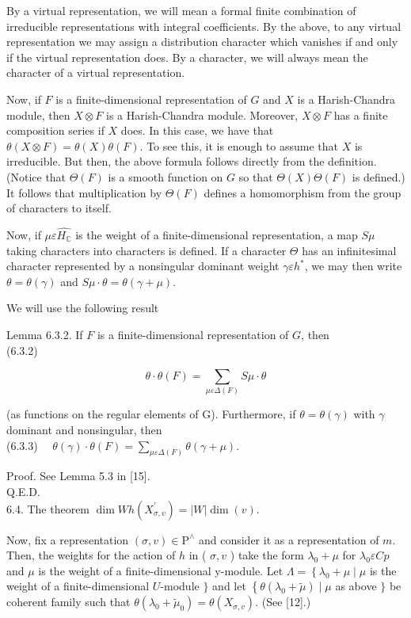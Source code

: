 \documentclass[10pt]{article}
\begin{document}
By a virtual representation, we will mean a formal finite combination of irreducible representations with integral coefficients. By the above, to any virtual representation we may assign a distribution character which vanishes if and only if the virtual representation does. By a character, we will always mean the character of a virtual representation.

Now, if $F$ is a finite-dimensional representation of $G$ and $X$ is a Harish-Chandra module, then $X \otimes F$ is a Harish-Chandra module. Moreover, $X \otimes F$ has a finite composition series if $X$ does. In this case, we have that $\theta(X \otimes F)=\theta(X) \theta(F)$. To see this, it is enough to assume that $X$ is irreducible. But then, the above formula follows directly from the definition. (Notice that $\Theta(F)$ is a smooth function on $G$ so that $\Theta(X) \Theta(F)$ is defined.) It follows that multiplication by $\Theta(F)$ defines a homomorphism from the group of characters to itself.

Now, if $\mu \varepsilon \widehat{H_{\mathbb{C}}}$ is the weight of a finite-dimensional representation, a map $S \mu$ taking characters into characters is defined. If a character $\Theta$ has an infinitesimal character represented by a nonsingular dominant weight $\gamma \varepsilon h^{*}$, we may then write $\theta=\theta(\gamma)$ and $S \mu \cdot \theta=\theta(\gamma+\mu)$.

We will use the following result

Lemma 6.3.2. If $F$ is a finite-dimensional representation of $G$, then\\
(6.3.2)

$$
\theta \cdot \theta(F)=\sum_{\mu \varepsilon \Delta(F)} S \mu \cdot \theta
$$

(as functions on the regular elements of G). Furthermore, if $\theta=\theta(\gamma)$ with $\gamma$ dominant and nonsingular, then\\
(6.3.3) $\quad \theta(\gamma) \cdot \theta(F)=\sum_{\mu \varepsilon \Delta(F)} \theta(\gamma+\mu)$.

Proof. See Lemma 5.3 in [15].\\
Q.E.D.\\
6.4. The theorem $\operatorname{dim} W h\left(X_{\sigma, v}^{\prime}\right)=|W| \operatorname{dim}(v)$.

Now, fix a representation $(\sigma, v) \in \mathrm{P}^{\wedge}$ and consider it as a representation of $m$. Then, the weights for the action of $h$ in ( $\sigma, v$ ) take the form $\lambda_{0}+\mu$ for $\lambda_{0} \varepsilon C p$ and $\mu$ is the weight of a finite-dimensional y-module. Let $\Lambda=\left\{\lambda_{0}+\mu \mid \mu\right.$ is the weight of a finite-dimensional $U$-module $\}$ and let $\left\{\theta\left(\lambda_{0}+\tilde{\mu}\right) \mid \mu\right.$ as above $\}$ be coherent family such that $\theta\left(\lambda_{0}+\tilde{\mu}_{0}\right)=\theta\left(X_{\sigma, v}\right)$. (See [12].)
\end{document}
